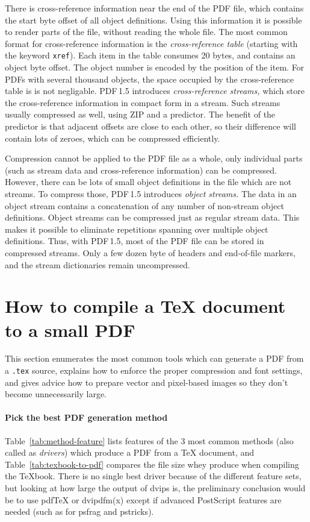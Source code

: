 \documentclass{ltugproc}
\def\cmd{\textsf}
\def\pkg{\textsf}
\begin{document}
There is cross-reference information near the end of the PDF file, which
contains the start byte offset of all object definitions. Using this
information it is possible to render parts of the file, without reading the
whole file. The most common format for cross-reference information is the
\emph{cross-reference table} (starting with the keyword \texttt{xref}). Each item
in the table consumes 20 bytes, and contains an object byte offset. The
object number is encoded by the position of the item. For PDFs with several
thousand objects, the space occupied by the cross-reference table is is not
negligable. PDF\,1.5 introduces \emph{cross-reference streams,} which store
the cross-reference information in compact form in a stream. Such streams
usually compressed as well, using ZIP and a predictor. The benefit of the
predictor is that adjacent offsets are close to each other, so their
difference will contain lots of zeroes, which can be compressed efficiently.

Compression cannot be applied to the PDF file as a whole, only individual
parts (such as stream data and cross-reference information) can be
compressed. However, there can be lots of small object definitions in the
file which are not streams. To compress those, PDF\,1.5 introduces
\emph{object streams.} The data in an object stream contains a concatenation
of any number of non-stream object definitions. Object streams can be
compressed just as regular stream data. This makes it possible to eliminate
repetitions spanning over multiple object definitions. Thus, with PDF\,1.5,
most of the PDF file can be stored in compressed streams. Only a few dozen
byte of headers and end-of-file markers, and the stream dictionaries remain
uncompressed.

\section{How to compile a \TeX{} document to a small PDF}\label{tex-to-pdf}

This section enumerates the most common tools which can generate a PDF from
a \texttt{.tex} source, explains how to enforce the proper compression and
font settings, and gives advice how to prepare vector and pixel-based images
so they don't become unnecessarily large.

\paragraph{Pick the best PDF generation method}
Table~\ref{tab:method-feature} lists features of the 3 most common methods
(also called as \emph{drivers}) which produce a PDF from a \TeX{} document,
and Table~\ref{tab:texbook-to-pdf} compares the file size whey produce when
compiling the \TeX{}book. There is no single best driver because of the
different feature sets, but looking at how large the output of \cmd{dvips}
is, the preliminary conclusion would be to use pdf\TeX{}
or \cmd{dvipdfm(x)} except if advanced PostScript features are needed (such
as for \pkg{psfrag} and \pkg{pstricks}).
\end{document}
